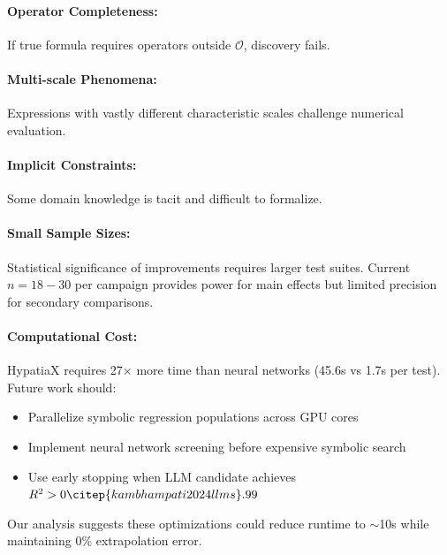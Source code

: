 \documentclass[twoside,11pt]{article}
\begin{document}
\paragraph{Operator Completeness:} If true formula requires operators outside $\mathcal{O}$, discovery fails\citep{koza1994genetic}.

\paragraph{Multi-scale Phenomena:} Expressions with vastly different characteristic scales challenge numerical evaluation.

\paragraph{Implicit Constraints:} Some domain knowledge is tacit and difficult to formalize.

\paragraph{Small Sample Sizes:} Statistical significance of improvements requires larger test suites. Current $n = 18-30$ per campaign provides power for main effects but limited precision for secondary comparisons.


\paragraph{Computational Cost:} HypatiaX requires 27$\times$ more time than neural networks (45.6s vs 1.7s per test)\citep{zhou2020universality}\citep{liu2020understanding}. Future work should:
\begin{itemize}
\item Parallelize symbolic regression populations across GPU cores\citep{la2021contemporary}
\item Implement neural network screening before expensive symbolic search
\item Use early stopping when LLM candidate achieves $R^2 > 0\citep{kambhampati2024llms}.99$
\end{itemize}

Our analysis suggests these optimizations could reduce runtime to $\sim$10s while maintaining 0\% extrapolation error.
\end{document}
